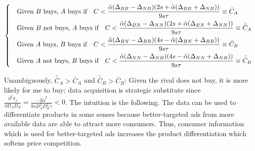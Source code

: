 \documentclass[12pt]{article}
\begin{document}
\begin{small}
	$\begin{dcases}
	&\text{Given $B$ buys, $A$ buys if} \quad C<\frac{\tilde{\alpha}(\Delta_{BB}-\Delta_{NB})(2s+\tilde{\alpha}(\Delta_{BB}+\Delta_{NB}))}{9s\tau} \equiv \bar{C}_A\\
	&\text{Given $B$ not buys, $A$ buys if}\quad C<\frac{\tilde{\alpha}(\Delta_{BN}-\Delta_{NN})(2s+\tilde{\alpha}(\Delta_{BN}+\Delta_{NN}))}{9s\tau} \equiv \bar{\bar{C}}_A\\
	&\text{Given $A$ buys, $B$ buys if}\quad C<\frac{\tilde{\alpha}(\Delta_{BN}-\Delta_{BB})(4s-\tilde{\alpha}(\Delta_{BN}+\Delta_{BB}))}{9s\tau} \equiv \bar{C}_B\\
	&\text{Given $A$ not buys, $B$ buys if}\quad C<\frac{\tilde{\alpha}(\Delta_{NN}-\Delta_{NB})(4s-\tilde{\alpha}(\Delta_{NN}+\Delta_{NB}))}{9s\tau} \equiv \bar{\bar{C}}_B\\
	\end{dcases}$
\end{small}
\bigskip

Unambiguously, $\bar{\bar{C}}_A>\bar{C}_A$ and $\bar{\bar{C}}_B>\bar{C}_B$: Given the rival does not buy, it is more likely for me to buy; data acquisition is strategic substitute since $\frac{\partial^2 \pi_j}{\partial D_A D_B} = \frac{-2\tilde{\alpha}^2}{9sD_A^2D_B^2\gamma}<0$. The intuition is the following. The data can be used to differentiate products in some senses because better-targeted ads from more available data are able to attract more consumers. Thus, consumer information which is used for better-targeted ads increases the product differentiation which softens price competition. 
\end{document}
